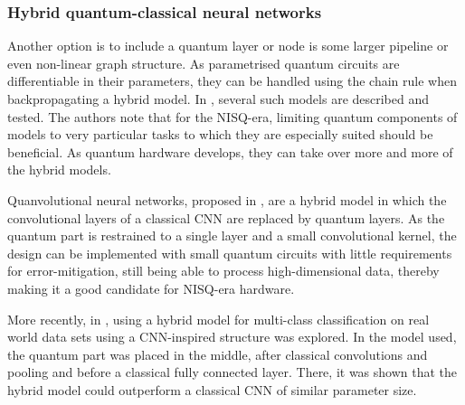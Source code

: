 \subsubsection{Hybrid quantum-classical neural networks}
Another option is to include a quantum layer or node is some larger pipeline or even non-linear graph structure.
As parametrised quantum circuits are differentiable in their parameters, they can be handled using the chain rule when backpropagating a hybrid model.
In \cite{killoran2019}, several such models are described and tested.
The authors note that for the NISQ-era, limiting quantum components of models to very particular tasks to which they are especially suited should be beneficial.
As quantum hardware develops, they can take over more and more of the hybrid models.

Quanvolutional neural networks, proposed in \cite{henderson2020}, are a hybrid model in which the convolutional layers of a classical CNN are replaced by quantum layers.
As the quantum part is restrained to a single layer and a small convolutional kernel, the design can be implemented with small quantum circuits with little requirements for error-mitigation, still being able to process high-dimensional data, thereby making it a good candidate for NISQ-era hardware.

More recently, in \cite{zeng2022}, using a hybrid model for multi-class classification on real world data sets using a CNN-inspired structure was explored.
In the model used, the quantum part was placed in the middle, after classical convolutions and pooling and before a classical fully connected layer.
There, it was shown that the hybrid model could outperform a classical CNN of similar parameter size.